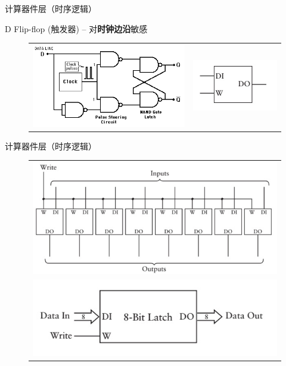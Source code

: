 \documentclass[UTF8]{ctexbeamer}
\begin{document}
\begin{frame}{计算器件层（时序逻辑）}
\begin{center}
\large D Flip-flop (触发器) -- 对\textbf{时钟边沿}敏感
\end{center}
\begin{figure}
\centering
\begin{tabular}{cc}
\includegraphics[width=0.6\linewidth]{fig/Lecture2/d-ff.png}&
\includegraphics[width=0.3\linewidth]{fig/Lecture2/d-ff_2.jpg}
\end{tabular}
\end{figure}
\end{frame}

\begin{frame}{计算器件层（时序逻辑）}
\begin{figure}
\centering
\begin{tabular}{c}
\includegraphics[width=0.8\linewidth]{fig/Lecture2/8bit-latch.jpg}\\
\includegraphics[width=0.6\linewidth]{fig/Lecture2/8bit-latch_2.jpg}
\end{tabular}
\end{figure}
\end{frame}
\end{document}
